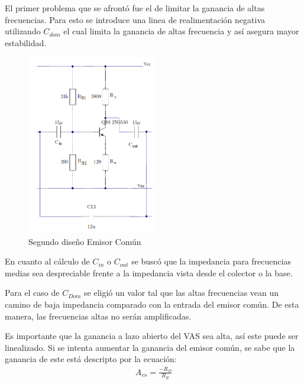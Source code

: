 El primer problema que se afrontó fue el de limitar la ganancia de altas frecuencias.
Para esto se introduce una linea de realimentación negativa utilizando $C_{dom}$ el cual limita la ganancia de altas frecuencia y así asegura mayor estabilidad.
 \begin{figure}[H]
\centering
	\includegraphics[width=0.5\textwidth]{ImagenesGain-Stage/ec2.png}
	\caption{Segundo diseño Emisor Común}
	\label{fig:ec2}
\end{figure}
En cuanto al cálculo de $C_{in}$ o $C_{out}$ se buscó que la impedancia para frecuencias medias sea despreciable frente a la impedancia vista desde el colector o la base.

Para el caso de $C_{Dom}$ se eligió un valor tal que las altas frecuencias vean un camino de baja impedancia comparado con la entrada del emisor común. De esta manera, las frecuencias altas no serán amplificadas.

Es importante que la ganancia a lazo abierto del VAS sea alta, así este puede ser linealizado. Si se intenta aumentar la ganancia del emisor común, se sabe que la ganancia de este está descripto por la ecuación:
\begin{align}
A_{vs}=\frac{-R_D}{R_E}
\end{align}

